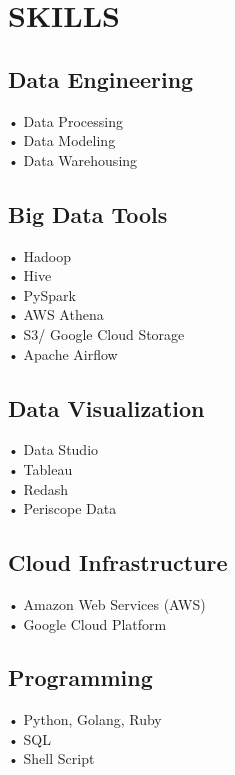 \documentclass[letterpaper]{deedy-resume} %
\begin{document}
\begin{minipage}[t]{0.33\textwidth} %


\section{SKILLS}
\subsection{Data Engineering}
• Data Processing  \\
• Data Modeling \\
• Data Warehousing \\

\subsection{Big Data Tools}
• Hadoop \\
• Hive \\
• PySpark \\
• AWS Athena \\
• S3/ Google Cloud Storage \\
• Apache Airflow  \\

\subsection{Data Visualization}
• Data Studio \\
• Tableau \\
• Redash \\
• Periscope Data \\

\subsection{Cloud Infrastructure}
• Amazon Web Services (AWS) \\
• Google Cloud Platform

\sectionspace %

\subsection{Programming}
• Python, Golang, Ruby \\
• SQL \\
• Shell Script\\


\end{minipage}
\end{document}
